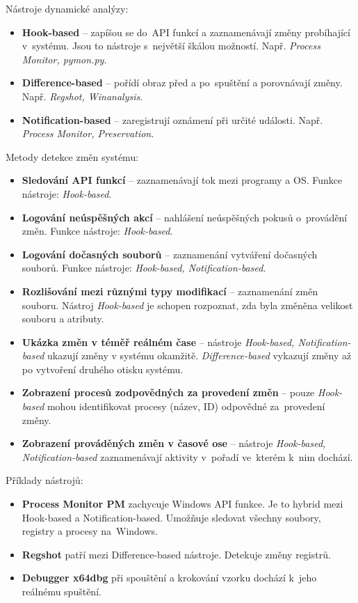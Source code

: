 Nástroje dynamické analýzy:

\begin{itemize}
    \item \textbf{Hook-based} -- zapíšou se do~API funkcí a zaznamenávají změny probíhající v~systému. Jsou to nástroje s~největší škálou možností.
    Např. \textit{Process Monitor, pymon.py}.
    \item \textbf{Difference-based} -- pořídí obraz před a po~spuštění a porovnávají změny.
    Např. \textit{Regshot, Winanalysis}.
    \item \textbf{Notification-based} -- zaregistrují oznámení při určité události.
    Např. \textit{Process Monitor, Preservation}.
\end{itemize}

Metody detekce změn systému:

\begin{itemize}
    \item \textbf{Sledování API funkcí} -- zaznamenávají tok mezi programy a OS.
    Funkce nástroje: \textit{Hook-based}.
    \item \textbf{Logování neúspěšných akcí} -- nahlášení neúspěšných pokusů o~provádění změn.
    Funkce nástroje: \textit{Hook-based}.
    \item \textbf{Logování dočasných souborů} -- zaznamenání vytváření dočasných souborů.
    Funkce nástroje: \textit{Hook-based, Notification-based}.
    \item \textbf{Rozlišování mezi různými typy modifikací} -- zaznamenání změn souboru.
    Nástroj \textit{Hook-based} je schopen rozpoznat, zda byla změněna velikost souboru a atributy.
    \item \textbf{Ukázka změn v téměř reálném čase} -- nástroje \textit{Hook-based, Notification-based} ukazují změny v systému okamžitě.
    \textit{Difference-based} vykazují změny až po vytvoření druhého otisku systému.
    \item \textbf{Zobrazení procesů zodpovědných za provedení změn} -- pouze \textit{Hook-based} mohou identifikovat procesy (název, ID) odpovědné za~provedení změny.
    \item \textbf{Zobrazení prováděných změn v časové ose} -- nástroje \textit{Hook-based, Notification-based} zaznamenávají aktivity v~pořadí ve~kterém k~nim dochází.
\end{itemize}

Příklady nástrojů:

\begin{itemize}
    \item
    	\textbf{Process Monitor PM} zachycuje Windows API funkce.
    	Je to hybrid mezi Hook-based a Notification-based.
    	Umožňuje sledovat všechny soubory, registry a procesy na~Windows.
    \item
    	\textbf{Regshot} patří mezi Difference-based nástroje.
    	Detekuje změny registrů.
    \item
    	\textbf{Debugger x64dbg} při spouštění a krokování vzorku dochází k~jeho reálnému spuštění.
\end{itemize}



